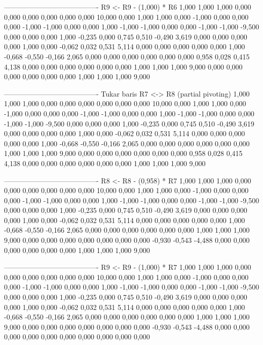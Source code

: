 \documentclass[12pt]{article}
\begin{document}
\begin{enumerate}
\begin{keluaran}
----------------------------------------
R9 <- R9 - (1,000) * R6
1,000   1,000   1,000   0,000   0,000   0,000   0,000   0,000   0,000   10,000
0,000   1,000   1,000   0,000   -1,000  0,000   0,000   0,000   -1,000  -1,000
0,000   0,000   1,000   -1,000  -1,000  0,000   0,000   -1,000  -1,000  -9,500
0,000   0,000   0,000   1,000   -0,235  0,000   0,745   0,510   -0,490  3,619
0,000   0,000   0,000   0,000   1,000   0,000   -0,062  0,032   0,531   5,114
0,000   0,000   0,000   0,000   0,000   1,000   -0,668  -0,550  -0,166  2,065
0,000   0,000   0,000   0,000   0,000   0,000   0,958   0,028   0,415   4,138
0,000   0,000   0,000   0,000   0,000   0,000   1,000   1,000   1,000   9,000
0,000   0,000   0,000   0,000   0,000   0,000   1,000   1,000   1,000   9,000

----------------------------------------
Tukar baris R7 <-> R8 (partial pivoting)
1,000   1,000   1,000   0,000   0,000   0,000   0,000   0,000   0,000   10,000
0,000   1,000   1,000   0,000   -1,000  0,000   0,000   0,000   -1,000  -1,000
0,000   0,000   1,000   -1,000  -1,000  0,000   0,000   -1,000  -1,000  -9,500
0,000   0,000   0,000   1,000   -0,235  0,000   0,745   0,510   -0,490  3,619
0,000   0,000   0,000   0,000   1,000   0,000   -0,062  0,032   0,531   5,114
0,000   0,000   0,000   0,000   0,000   1,000   -0,668  -0,550  -0,166  2,065
0,000   0,000   0,000   0,000   0,000   0,000   1,000   1,000   1,000   9,000
0,000   0,000   0,000   0,000   0,000   0,000   0,958   0,028   0,415   4,138
0,000   0,000   0,000   0,000   0,000   0,000   1,000   1,000   1,000   9,000

----------------------------------------
R8 <- R8 - (0,958) * R7
1,000   1,000   1,000   0,000   0,000   0,000   0,000   0,000   0,000   10,000
0,000   1,000   1,000   0,000   -1,000  0,000   0,000   0,000   -1,000  -1,000
0,000   0,000   1,000   -1,000  -1,000  0,000   0,000   -1,000  -1,000  -9,500
0,000   0,000   0,000   1,000   -0,235  0,000   0,745   0,510   -0,490  3,619
0,000   0,000   0,000   0,000   1,000   0,000   -0,062  0,032   0,531   5,114
0,000   0,000   0,000   0,000   0,000   1,000   -0,668  -0,550  -0,166  2,065
0,000   0,000   0,000   0,000   0,000   0,000   1,000   1,000   1,000   9,000
0,000   0,000   0,000   0,000   0,000   0,000   0,000   -0,930  -0,543  -4,488
0,000   0,000   0,000   0,000   0,000   0,000   1,000   1,000   1,000   9,000

----------------------------------------
R9 <- R9 - (1,000) * R7
1,000   1,000   1,000   0,000   0,000   0,000   0,000   0,000   0,000   10,000
0,000   1,000   1,000   0,000   -1,000  0,000   0,000   0,000   -1,000  -1,000
0,000   0,000   1,000   -1,000  -1,000  0,000   0,000   -1,000  -1,000  -9,500
0,000   0,000   0,000   1,000   -0,235  0,000   0,745   0,510   -0,490  3,619
0,000   0,000   0,000   0,000   1,000   0,000   -0,062  0,032   0,531   5,114
0,000   0,000   0,000   0,000   0,000   1,000   -0,668  -0,550  -0,166  2,065
0,000   0,000   0,000   0,000   0,000   0,000   1,000   1,000   1,000   9,000
0,000   0,000   0,000   0,000   0,000   0,000   0,000   -0,930  -0,543  -4,488
0,000   0,000   0,000   0,000   0,000   0,000   0,000   0,000   0,000   0,000


\end{keluaran}
\end{enumerate}
\end{document}
